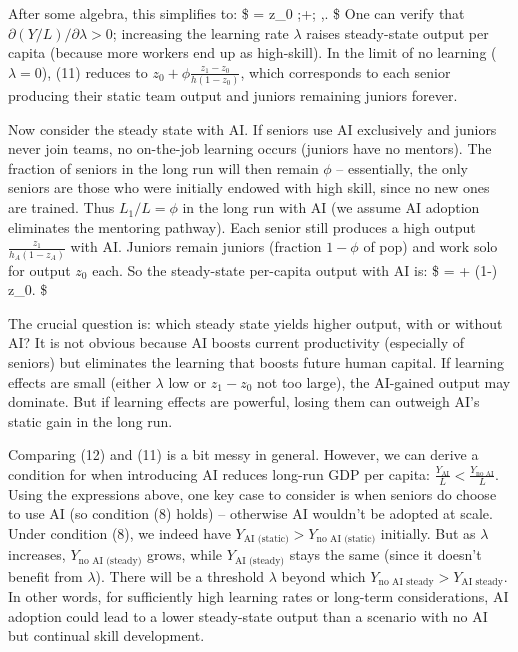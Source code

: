 \documentclass[12pt]{article}
\begin{document}
After some algebra, this simplifies to: \$  =
z\_0 ;+;
\phi {},.
\$ One can verify that \(\partial (Y/L)/\partial \lambda > 0\);
increasing the learning rate \(\lambda\) raises steady-state output per
capita (because more workers end up as high-skill). In the limit of no
learning (\(\lambda=0\)), (11) reduces to
\(z_0 + \phi\frac{z_1 - z_0}{h(1-z_0)}\), which corresponds to each
senior producing their static team output and juniors remaining juniors
forever.

Now consider the steady state {with AI}. If seniors use AI
exclusively and juniors never join teams, {no on-the-job learning
occurs} (juniors have no mentors). The fraction of seniors in the long
run will then remain \(\phi\) -- essentially, the only seniors are those
who were initially endowed with high skill, since no new ones are
trained. Thus \(L_1/L = \phi\) in the long run with AI (we assume AI
adoption eliminates the mentoring pathway). Each senior still produces a
high output \(\frac{z_1}{h_A(1-z_A)}\) with AI. Juniors remain juniors
(fraction \(1-\phi\) of pop) and work solo for output \(z_0\) each. So
the {steady-state per-capita output with AI} is: \$
 = \phi {} +
(1-\phi) z\_0. \$

The crucial question is: {which steady state yields higher output,
with or without AI?} It is not obvious because {AI boosts current
productivity} (especially of seniors) but {eliminates the
learning that boosts future human capital}. If learning effects are
small (either \(\lambda\) low or \(z_1 - z_0\) not too large), the
AI-gained output may dominate. But if learning effects are powerful,
losing them can outweigh AI's static gain in the long run.

Comparing (12) and (11) is a bit messy in general. However, we can
derive a condition for when introducing AI {reduces long-run GDP
per capita}: \(\frac{Y_{\text{AI}}}{L} < \frac{Y_{\text{no AI}}}{L}.\)
Using the expressions above, one key case to consider is when seniors
{do} choose to use AI (so condition (8) holds) -- otherwise AI
wouldn't be adopted at scale. Under condition (8), we indeed have
\(Y_{\text{AI (static)}} > Y_{\text{no AI (static)}}\) initially. But as
\(\lambda\) increases, \(Y_{\text{no AI (steady)}}\) grows, while
\(Y_{\text{AI (steady)}}\) stays the same (since it doesn't benefit from
\(\lambda\)). There will be a threshold \(\lambda\) beyond which
\(Y_{\text{no AI steady}} > Y_{\text{AI steady}}\). In other words,
{for sufficiently high learning rates or long-term
considerations, AI adoption could lead to a lower steady-state output}
than a scenario with no AI but continual skill development.
\end{document}
